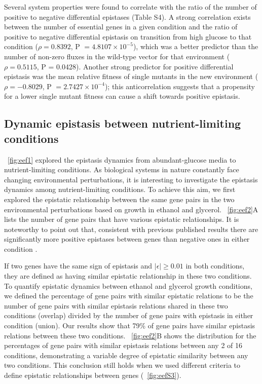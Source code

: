 Several system properties were found to correlate with the ratio of
the number of positive to negative differential epistases (Table
S4). A strong correlation exists between the number of essential genes
in a given condition and the ratio of positive to negative
differential epistasis on transition from high glucose to that
condition ($\rho = 0.8392$, P $=4.8107 \times 10^{-5}$), which was a better predictor
than the number of non-zero fluxes in the wild-type vector for that
environment ($\rho = 0.5115$, P = 0.0428). Another strong predictor for
positive differential epistasis was the mean relative fitness of
single mutants in the new environment ($\rho = -0.8029$, P $= 2.7427 \times 10^{-4}$);
this anticorrelation suggests that a propensity for a lower single
mutant fitness can cause a shift towards positive epistasis.

\subsection{Dynamic epistasis between nutrient-limiting conditions}

\Fig~\ref{fig:eef1} explored the epistasis dynamics from abundant-glucose media
to nutrient-limiting conditions. As biological systems in nature
constantly face changing environmental perturbations, it is
interesting to investigate the epistasis dynamics among
nutrient-limiting conditions. To achieve this aim, we first explored
the epistatic relationship between the same gene pairs in the two
environmental perturbations based on growth in ethanol and
glycerol. \Fig~\ref{fig:eef2}A lists the number of gene pairs that have various
epistatic relationships. It is noteworthy to point out that,
consistent with previous published results there are significantly
more positive epistases between genes than negative ones in either
condition \citep{He2010}.


If two genes have the same sign of epistasis and
$\left|\epsilon\right| \geq 0.01$ in both conditions, they are defined
as having similar epistatic
relationship in these two conditions. To quantify epistatic dynamics
between ethanol and glycerol growth conditions, we defined the
percentage of gene pairs with similar epistatic relations to be the
number of gene pairs with similar epistasis relations shared in these
two conditions (overlap) divided by the number of gene pairs with
epistasis in either condition (union). Our results show that 79\% of
gene pairs have similar epistasis relations between these two
conditions. \Fig~\ref{fig:eef2}B shows the distribution for the percentages of
gene pairs with similar epistasis relations between any 2 of 16
conditions, demonstrating a variable degree of epistatic similarity
between any two conditions.  This conclusion still holds when we used
different criteria to define epistatic relationships between genes
(\Fig~\ref{fig:eefS3}).

